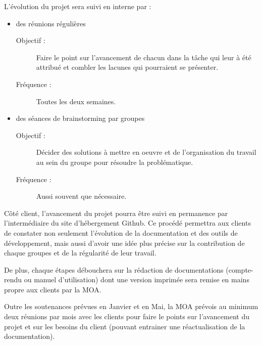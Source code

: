 \documentclass{../../res/univ-projet}
\begin{document}
	L'évolution du projet sera suivi en interne par : 
	\begin{itemize}
		\item des réunions régulières 
		\begin{description}
			\item[Objectif :] Faire le point sur l'avancement de chacun dans la tâche qui leur à été attribué et combler les lacunes qui pourraient se présenter.
			\item[Fréquence :] Toutes les deux semaines.
		\end{description}
		\item des séances de brainstorming par groupes
		\begin{description}
			\item[Objectif :] Décider des solutions à mettre en oeuvre et de l'organisation du travail au sein du groupe pour résoudre la problématique.
			\item[Fréquence :] Aussi souvent que nécessaire.
		\end{description}
	\end{itemize}

	Côté client, l'avancement du projet pourra être suivi en permanence par l'intermédiaire du site d'hébergement Github. Ce procédé permettra aux clients de constater non seulement l'évolution de la documentation et des outils de développement, mais aussi d'avoir une idée plus précise sur la contribution de chaque groupes et de la régularité de leur travail.

	De plus, chaque étapes débouchera sur la rédaction de documentations (compte-rendu ou manuel d'utilisation) dont une version imprimée sera remise en mains propre aux clients par la MOA.


	Outre les soutenances prévues en Janvier et en Mai, la MOA prévois au minimum deux réunions par mois avec les clients pour faire le points sur l'avancement du projet et sur les besoins du client (pouvant entrainer une réactualisation de la documentation).
\end{document}
